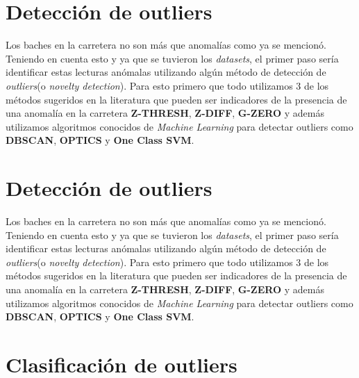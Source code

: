 \section*{Detección de outliers}
	Los baches en la carretera no son más que anomalías como ya se mencionó. Teniendo en cuenta esto y ya que se tuvieron 
	los \emph{datasets}, el primer paso sería identificar estas lecturas anómalas utilizando algún método de detección de
	\emph{outliers}(o \emph{novelty detection}). Para esto primero que todo utilizamos 3 de los métodos sugeridos en la 
	literatura que pueden ser indicadores de la presencia de una anomalía en la carretera \textbf{Z-THRESH}, \textbf{Z-DIFF},
	\textbf{G-ZERO} y además utilizamos algoritmos conocidos de \emph{Machine Learning} para detectar outliers como \textbf{DBSCAN},
	\textbf{OPTICS} y \textbf{One Class SVM}.


\section*{Detección de outliers}
	Los baches en la carretera no son más que anomalías como ya se mencionó. Teniendo en cuenta esto y ya que se tuvieron 
	los \emph{datasets}, el primer paso sería identificar estas lecturas anómalas utilizando algún método de detección de
	\emph{outliers}(o \emph{novelty detection}). Para esto primero que todo utilizamos 3 de los métodos sugeridos en la 
	literatura que pueden ser indicadores de la presencia de una anomalía en la carretera \textbf{Z-THRESH}, \textbf{Z-DIFF},
	\textbf{G-ZERO} y además utilizamos algoritmos conocidos de \emph{Machine Learning} para detectar outliers como \textbf{DBSCAN},
	\textbf{OPTICS} y \textbf{One Class SVM}.

\section*{Clasificación de outliers}


